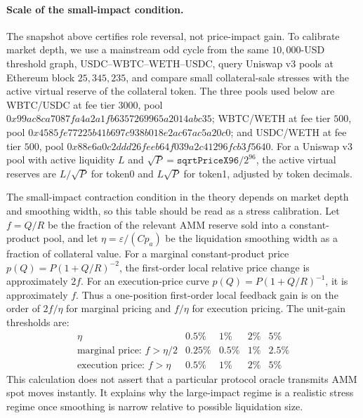 \documentclass{llncs}
\begin{document}
\begin{center}

\end{center}

\paragraph{Scale of the small-impact condition.}
The snapshot above certifies role reversal, not price-impact gain. To calibrate market depth, we use a mainstream odd cycle from the same \(10{,}000\)-USD threshold graph, \(\mathrm{USDC}\)--\(\mathrm{WBTC}\)--\(\mathrm{WETH}\)--\(\mathrm{USDC}\), query Uniswap v3 pools at Ethereum block \(25{,}345{,}235\), and compare small collateral-sale stresses with the active virtual reserve of the collateral token. The three pools used below are WBTC/USDC at fee tier \(3000\), pool \(0x99ac8ca7087fa4a2a1fb6357269965a2014abc35\); WBTC/WETH at fee tier \(500\), pool \(0x4585fe77225b41b697c938b018e2ac67ac5a20c0\); and USDC/WETH at fee tier \(500\), pool \(0x88e6a0c2ddd26feeb64f039a2c41296fcb3f5640\). For a Uniswap v3 pool with active liquidity \(L\) and \(\sqrt P=\texttt{sqrtPriceX96}/2^{96}\), the active virtual reserves are \(L/\sqrt P\) for token0 and \(L\sqrt P\) for token1, adjusted by token decimals.

\begin{center}

\end{center}

The small-impact contraction condition in the theory depends on market depth and smoothing width, so this table should be read as a stress calibration. Let \(f=Q/R\) be the fraction of the relevant AMM reserve sold into a constant-product pool, and let \(\eta=\varepsilon/(C p_a)\) be the liquidation smoothing width as a fraction of collateral value. For a marginal constant-product price \(p(Q)=P(1+Q/R)^{-2}\), the first-order local relative price change is approximately \(2f\). For an execution-price curve \(p(Q)=P(1+Q/R)^{-1}\), it is approximately \(f\). Thus a one-position first-order local feedback gain is on the order of \(2f/\eta\) for marginal pricing and \(f/\eta\) for execution pricing. The unit-gain thresholds are:
\[
\begin{array}{c|cccc}
\eta & 0.5\% & 1\% & 2\% & 5\%\\
\hline
\text{marginal price: } f>\eta/2 & 0.25\% & 0.5\% & 1\% & 2.5\%\\
\text{execution price: } f>\eta & 0.5\% & 1\% & 2\% & 5\%
\end{array}
\]
This calculation does not assert that a particular protocol oracle transmits AMM spot moves instantly. It explains why the large-impact regime is a realistic stress regime once smoothing is narrow relative to possible liquidation size.
\end{document}
